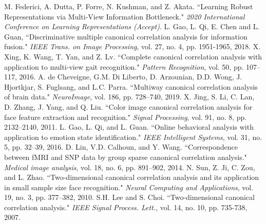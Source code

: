 \documentclass[journal]{IEEEtran}
\begin{document}

%
%
%
\begin{thebibliography}{1}

M. Federici, A. Dutta, P. Forre, N. Kushman, and Z. Akata. ``Learning Robust Representations via Multi-View Information Bottleneck." \emph{2020 International Conference on Learning Representations (Accept)}.
L. Gao, L. Qi, E. Chen and L. Guan, ``Discriminative multiple canonical correlation analysis for information fusion." \emph{IEEE Trans. on Image Processing}, vol. 27, no. 4, pp. 1951-1965, 2018.
X. Xing, K. Wang, T. Yan, and Z. Lv. ``Complete canonical correlation analysis with application to multi-view gait recognition." \emph{Pattern Recognition}, vol. 50, pp. 107--117, 2016.
A. de Cheveigne, G.M. Di Liberto, D. Arzounian, D.D. Wong, J. Hjortkjar, S. Fuglsang, and L.C. Parra. ``Multiway canonical correlation analysis of brain data." \emph{NeuroImage}, vol. 186, pp. 728--740, 2019.
X. Jing, S. Li, C. Lan, D. Zhang, J. Yang, and Q. Liu. ``Color image canonical correlation analysis for face feature extraction and recognition." \emph{Signal Processing}, vol. 91, no. 8, pp. 2132--2140, 2011.
L. Gao, L. Qi, and L. Guan. ``Online behavioral analysis with application to emotion state identification." \emph{IEEE Intelligent Systems}, vol. 31, no. 5, pp. 32--39, 2016.
D. Lin, V.D. Calhoun, and Y. Wang. ``Correspondence between fMRI and SNP data by group sparse canonical correlation analysis." \emph{Medical image analysis}, vol. 18, no. 6, pp. 891--902, 2014.
N. Sun, Z. Ji, C. Zou, and L. Zhao. ``Two-dimensional canonical correlation analysis and its application in small sample size face recognition." \emph{Neural Computing and Applications}, vol. 19, no. 3, pp. 377--382, 2010.
S.H. Lee and S. Choi. ``Two-dimensional canonical correlation analysis." \emph{IEEE Signal Process. Lett.}, vol. 14, no. 10,  pp. 735-738, 2007.

\end{thebibliography}
\end{document}
